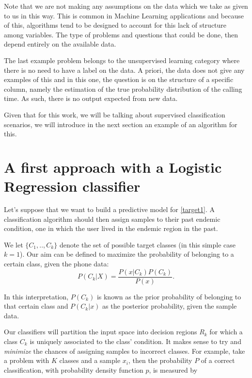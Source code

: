 Note that we are not making any assumptions on the data which we take as given to us in this way.
This is common in Machine Learning applications and because of this, algorithms tend to be designed to account for this lack of structure among variables.
The type of problems and questions that could be done, then depend entirely on the available data.

The last example problem belongs to the unsupervised learning category where there is no need to have a label on the data.
A priori, the data does not give any examples of this and in this one, the question is on the structure of a specific column, namely the estimation of the true probability distribution of the calling time.
As such, there is no output expected from new data.

Given that for this work, we will be talking about supervised classification scenarios, we will introduce in the next section an example of an algorithm for this.

\section{A first approach with a Logistic Regression classifier}\label{section-logisticRegression}

Let's suppose that we want to build a predictive model for \cref{target1}.
A classification algorithm should then assign samples to their past endemic condition, one in which the user lived in the endemic region in the past.

We let $\{C_1,..,C_k\}$ denote the set of possible target classes (in this simple case $k=1$).
Our aim can be defined to maximize the probability of belonging to a certain class, given the phone data:
\begin{equation}
P(C_k| X) = \frac{P(x|C_k)P(C_k)}{P(x)} .
\end{equation}

In this interpretation, $P(C_k)$ is known as the prior probability of belonging to that certain class and $P(C_k|x)$ as the posterior probability, given the sample data.

Our classifiers will partition the input space into decision regions $R_k$ for which a class $C_k$ is uniquely associated to the class' condition.
It makes sense to try and \textit{minimize} the chances of assigning samples to incorrect classes.
For example, take a problem with $K$ classes and a sample $x_i$, then the probability $P$ of a correct classification, with probability density function $p$, is measured by


